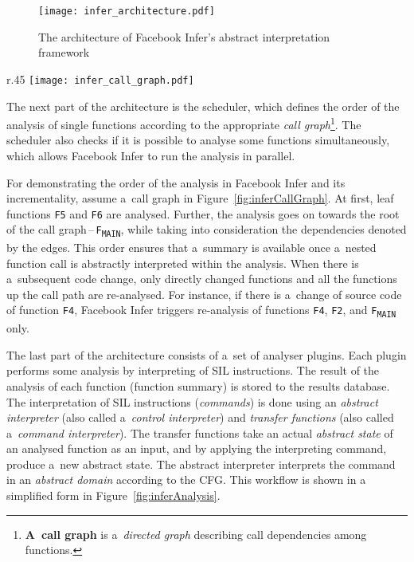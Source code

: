 \begin{figure}[hbt]
    \centering
    \texttt{[image: infer\_architecture.pdf]}
    \caption{%
        The architecture of Facebook Infer's abstract interpretation
        framework~\cite{inferAISlides, projectPracticeMarcin2018}
    }
    \label{fig:inferArch}
\end{figure}

\begin{wrapfigure}{r}{.45 \linewidth}
    \centering
    \vspace{-1em}
    \texttt{[image: infer\_call\_graph.pdf]}
    \caption{%
        A~call graph for an illustration of Facebook Infer's
        analysis process~\cite{inferAISlides, excel2019FBInfer,
        projectPracticeMarcin2018}
    }
    \label{fig:inferCallGraph}
\end{wrapfigure}
The next part of the architecture is the scheduler, which defines the
order of the analysis of single functions according to the appropriate
\emph{call graph}\footnote{\textbf{A~call graph} is a~\emph{directed graph}
describing call dependencies among functions.}. The scheduler also checks
if it is possible to analyse some functions simultaneously, which allows
Facebook Infer to run the analysis in parallel.

\begin{example}
    For demonstrating the order of the analysis in Facebook Infer and its
    incrementality, assume a~call graph in Figure~\ref{fig:inferCallGraph}.
    At first, leaf functions \texttt{F5} and \texttt{F6} are analysed. 
    Further, the analysis goes on towards the root of the call
    graph\,--\,\texttt{F\textsubscript{MAIN}}, while taking into 
    consideration the dependencies denoted by the edges. This order ensures 
    that a~summary is available once a~nested function call is abstractly
    interpreted within the analysis. When there is a~subsequent code change,
    only directly changed functions and all the functions up the call path 
    are re-analysed. For instance, if there is a~change of source code of
    function \texttt{F4}, Facebook Infer triggers re-analysis of 
    functions \texttt{F4}, \texttt{F2}, and \texttt{F\textsubscript{MAIN}} 
    only.
\end{example}

The last part of the architecture consists of a~set of analyser plugins.
Each plugin performs some analysis by interpreting of SIL instructions.
The result of the analysis of each function (function summary) is stored to
the results database. The interpretation of SIL instructions (\emph{commands})
is done using an \emph{abstract interpreter} (also called a~\emph{control
interpreter}) and \emph{transfer functions} (also called a~\emph{command
interpreter}). The transfer functions take an actual \emph{abstract state}
of an analysed function as an input, and by applying the interpreting command,
produce a~new abstract state. The abstract interpreter interprets the
command in an \emph{abstract domain} according to the CFG. This workflow is
shown in a simplified form in Figure~\ref{fig:inferAnalysis}.

